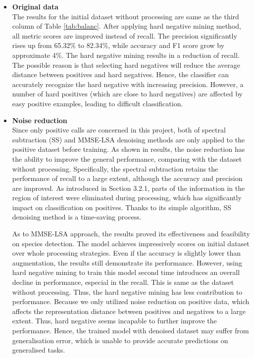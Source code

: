 \begin{itemize}[leftmargin=*]
    \item \textbf{Original data}\\
    The results for the initial dataset without processing are same as the third column of Table \ref{tab:balanc}. After applying hard negative mining method, all metric scores are improved instead of recall. The precision significantly rises up from 65.32\% to 82.34\%, while accuracy and F1 score grow by approximate 4\%. The hard negative mining results in a reduction of recall. The possible reason is that selecting hard negatives will reduce the average distance between positives and hard negatives. Hence, the classifier can accurately recognize the hard negative with increasing precision. However, a number of hard positives (which are close to hard negatives) are affected by easy positive examples, leading to difficult classification.
    \item \textbf{Noise reduction}\\
    Since only positive calls are concerned in this project, both of spectral subtraction (SS) and MMSE-LSA denoising methods are only applied to the positive dataset before training. As shown in results, the noise reduction has the ability to improve the general performance, comparing with the dataset without processing. Specifically, the spectral subtraction retains the performance of recall to a large extent, although the accuracy and precision are improved. As introduced in Section 3.2.1, parts of the information in the region of interest were eliminated during processing, which has significantly impact on classification on positives. Thanks to its simple algorithm, SS denoising method is a time-saving process. \par
    As to MMSE-LSA approach, the results proved its effectiveness and feasibility on species detection. The model achieves impressively scores on initial dataset over whole processing strategies. Even if the accuracy is slightly lower than augmentation, the results still demonstrate its performance. However, using hard negative mining to train this model second time introduces an overall decline in performance, especial in the recall. This is same as the dataset without processing. Thus, the hard negative mining has less contribution to performance. Because we only utilized noise reduction on positive data, which affects the representation distance between positives and negatives to a large extent. Thus, hard negative seems incapable to further improve the performance. Hence, the trained model with denoised dataset may suffer from generalisation error, which is unable to provide accurate predictions on generalised tasks.

\end{itemize}
